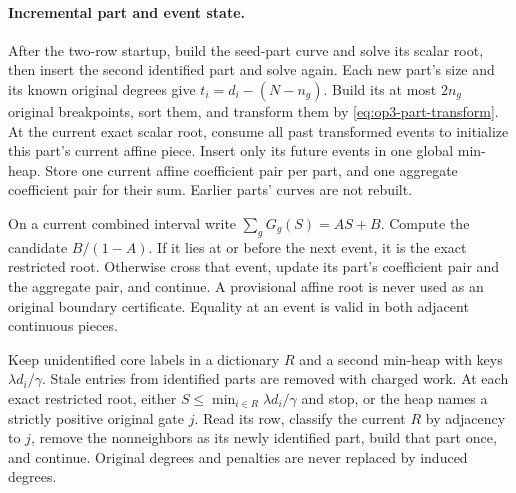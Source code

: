 \paragraph{Incremental part and event state.}
After the two-row startup, build the seed-part curve and solve its scalar
root, then insert the second identified part and solve again. Each new
part's size and its known original degrees give $t_i=d_i-(N-n_g)$.
Build its at most $2n_g$ original breakpoints, sort them, and transform
them by \cref{eq:op3-part-transform}. At the current exact scalar root,
consume all past transformed events to initialize this part's current
affine piece. Insert only its future events in one global min-heap.
Store one current affine coefficient pair per part, and one aggregate
coefficient pair for their sum. Earlier parts' curves are not rebuilt.

On a current combined interval write $\sum_gG_g(S)=AS+B$. Compute the
candidate $B/(1-A)$. If it lies at or before the next event, it is the exact
restricted root. Otherwise cross that event, update its part's coefficient
pair and the aggregate pair, and continue. A provisional affine root is
never used as an original boundary certificate. Equality at an event is
valid in both adjacent continuous pieces.

Keep unidentified core labels in a dictionary $R$ and a second min-heap
with keys $\lambda d_i/\gamma$. Stale entries from identified parts are
removed with charged work. At each exact restricted root, either
$S\leq\min_{i\in R}\lambda d_i/\gamma$ and stop, or the heap names a
strictly positive original gate $j$. Read its row, classify the current
$R$ by adjacency to $j$, remove the nonneighbors as its newly identified
part, build that part once, and continue. Original degrees and penalties
are never replaced by induced degrees.

